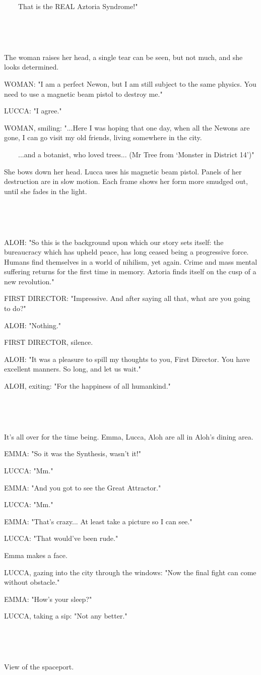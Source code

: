 \documentclass[11pt]{article}
\begin{document}
\ \ \ \ That is the REAL Aztoria Syndrome!"

\ 

\ 

The woman raises her head, a single tear can be seen, but not much, and she looks determined.

WOMAN: "I am a perfect Newon, but I am still subject to the same physics.
You need to use a magnetic beam pistol to destroy me."

LUCCA: "I agree."

WOMAN, smiling: "...Here I was hoping that one day, when all the Newons are gone, I can go visit my old friends, living somewhere in the city.

\ \ \ \ ...and a botanist, who loved trees... (Mr Tree from `Monster in District 14')"

She bows down her head.
Lucca uses his magnetic beam pistol.
Panels of her destruction are in slow motion.
Each frame shows her form more smudged out, until she fades in the light.

\ 

\ 

ALOH: "So this is the background upon which our story sets itself: 
the bureaucracy which has upheld peace, has long ceased being a progressive force. 
Humans find themselves in a world of nihilism, yet again.
Crime and mass mental suffering returns for the first time in memory.
Aztoria finds itself on the cusp of a new revolution." 

FIRST DIRECTOR: "Impressive. And after saying all that, what are you going to do?"

ALOH: "Nothing."

FIRST DIRECTOR, silence.

ALOH: "It was a pleasure to spill my thoughts to you, First Director.
You have excellent manners.
So long, and let us wait."

ALOH, exiting: "For the happiness of all humankind."

\ 

\ 

It's all over for the time being.
Emma, Lucca, Aloh are all in Aloh's dining area.

EMMA: "So it was the Synthesis, wasn't it!"

LUCCA: "Mm."

EMMA: "And you got to see the Great Attractor."

LUCCA: "Mm."

EMMA: "That's crazy...
At least take a picture so I can see."

LUCCA: "That would've been rude."

Emma makes a face.

LUCCA, gazing into the city through the windows: "Now the final fight can come without obstacle."

EMMA: "How's your sleep?"

LUCCA, taking a sip: "Not any better."

\ 

\ 

View of the spaceport.
\end{document}
